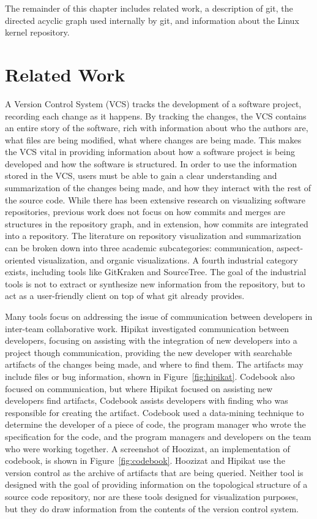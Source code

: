 The remainder of this chapter includes related work, a description of
git, the directed acyclic graph used internally by git, and information
about the Linux kernel repository.

\section{Related Work}\label{sec:related_work}

A Version Control System (VCS) tracks the development of a software project,
recording each change as it happens. By tracking the changes, the VCS
contains an entire story of the software, rich with information about
who the authors are, what files are being modified, what where changes
are being made. This makes the VCS vital in providing information about
how a software project is being developed and how the software is
structured. In order to use the information stored in the VCS, users
must be able to gain a clear understanding and summarization of the
changes being made, and how they interact with the rest of the source
code. While there has been extensive research on visualizing software
repositories, previous work does not focus on how commits and merges are
structures in the repository graph, and in extension, how commits are
integrated into a repository. The literature on repository visualization
and summarization can be broken down into three academic subcategories:
communication\cite{Cubranic2005,Begel2010}, aspect-oriented
visualization\cite{Ambros2005,Burch2005,Ambros2009}, and organic
visualizations\cite{ogawa09,Caudwell2010}. A fourth industrial category
exists, including tools like GitKraken and SourceTree. The goal of the
industrial tools is not to extract or synthesize new information from
the repository, but to act as a user-friendly client on top of what git
already provides.

Many tools focus on addressing the issue of communication between
developers in inter-team collaborative work. Hipikat\cite{Cubranic2005}
investigated communication between developers, focusing on assisting
with the integration of new developers into a project though
communication, providing the new developer with searchable artifacts of
the changes being made, and where to find them. The artifacts may
include files or bug information, shown in Figure~\ref{fig:hipikat}.
Codebook\cite{Begel2010} also focused on communication, but where
Hipikat focused on assisting new developers find artifacts, Codebook
assists developers with finding who was responsible for creating the
artifact. Codebook used a data-mining technique to determine the
developer of a piece of code, the program manager who wrote the
specification for the code, and the program managers and developers on
the team who were working together. A screenshot of Hoozizat, an
implementation of codebook, is shown in Figure~\ref{fig:codebook}.
Hoozizat and Hipikat use the version control as the archive of artifacts
that are being queried. Neither tool is designed with the goal of
providing information on the topological structure of a source code
repository, nor are these tools designed for visualization purposes, but
they do draw information from the contents of the version control
system.

